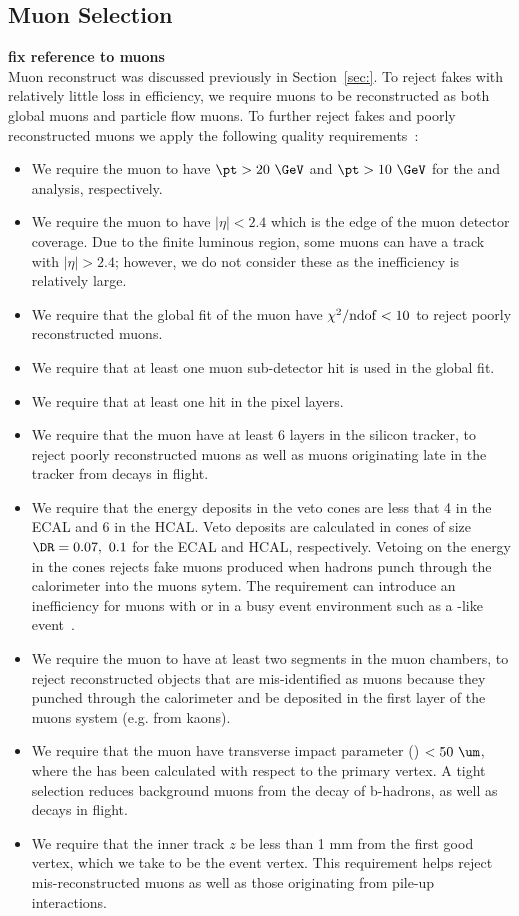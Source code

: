 \subsection{Muon Selection}
\label{sec:evtsel_mu}
{\bf \color{red} fix reference to muons} \\
Muon reconstruct was discussed previously in Section~\ref{sec:}. To reject
fakes with relatively little loss in efficiency, we require muons to be
reconstructed as both global muons and particle flow muons. To further
reject fakes and poorly reconstructed muons we apply the following quality
requirements~\cite{an_ssb2013,muonidtwiki}:
\begin{itemize}
\item We require the muon to have $\pt > 20\ \GeV$ and $\pt > 10\ \GeV$ for the
\hpt and \lpt analysis, respectively.
\item We require the muon to have $|\eta| < 2.4$ which is the edge of the
muon detector coverage. Due to the finite luminous region, some muons can
have a track with $|\eta| > 2.4$; however, we do not consider these as the
inefficiency is relatively large.
\item We require that the global fit of the muon have $\chi^2/\rm{ndof} < 10$
to reject poorly reconstructed muons.
\item We require that at least one muon sub-detector hit is used in the global
fit.
\item We require that at least one hit in the pixel layers.
\item We require that the muon have at least 6 layers in the silicon tracker,
to reject poorly reconstructed muons as well as muons originating late in the
tracker from decays in flight.
\item We require that the energy deposits in the veto cones are less that
4 \GeV in the ECAL and 6 \GeV in the HCAL. Veto deposits are calculated in
cones of size $\DR = 0.07,\ 0.1$ for the ECAL and HCAL, respectively. Vetoing
on the energy in the cones rejects fake muons produced when hadrons punch
through the calorimeter into the muons sytem. The requirement can introduce
an inefficiency for muons with \hpt or in a busy event environment such as a
\ttbar-like event~\cite{an_098_2008}.
\item We require the muon to have at least two segments in the muon chambers,
to reject reconstructed objects that are mis-identified as muons because they
punched through the calorimeter and be deposited in the first layer of the
muons system (e.g. from kaons).
\item We require that the muon have transverse impact parameter (\dzero) $< 50\
\um$, where the \dzero has been calculated with respect to the primary vertex.
A tight selection reduces background muons from the decay of b-hadrons, as well
as decays in flight.
\item We require that the inner track $z$ be less than 1 mm from the first good
vertex, which we take to be the event vertex. This requirement helps reject
mis-reconstructed muons as well as those originating from pile-up interactions.
\end{itemize}
